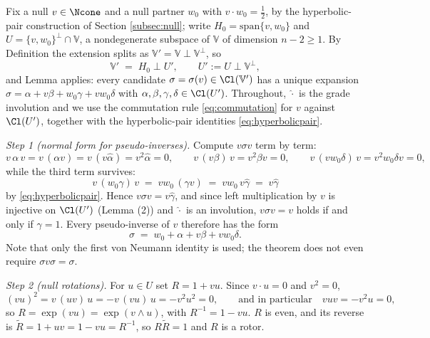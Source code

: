 Fix a null $v \in \Ncone$ and a null partner $w_0$ with $v \cdot w_0 = \tfrac12$, by the hyperbolic-pair construction of Section \ref{subsec:null}; write $H_0 = \mathrm{span}\{v, w_0\}$ and $U = \{v, w_0\}^{\perp} \cap \mathbb{V}$, a nondegenerate subspace of $\mathbb{V}$ of dimension $n - 2 \geq 1$. By Definition  the extension splits as $\mathbb{V}' = \mathbb{V} \perp \mathbb{V}^{\perp}$, so
\[
\mathbb{V}' \;=\; H_0 \perp U', \qquad U' \mathrel{:=} U \perp \mathbb{V}^{\perp},
\]
and Lemma  applies: every candidate $\sigma = \sigma(v) \in \Cl(\mathbb{V}')$ has a unique expansion $\sigma = \alpha + v\beta + w_0\gamma + v w_0 \delta$ with $\alpha, \beta, \gamma, \delta \in \Cl(U')$. Throughout, $\hat{\cdot}$ is the grade involution and we use the commutation rule \eqref{eq:commutation} for $v$ against $\Cl(U')$, together with the hyperbolic-pair identities \eqref{eq:hyperbolicpair}.

\emph{Step 1 (normal form for pseudo-inverses).} Compute $v\sigma v$ term by term:
\[
v\,\alpha\, v = v\, (\alpha v) = v\,(v \hat{\alpha}) = v^2 \hat\alpha = 0, \qquad
v\,(v\beta)\,v = v^2 \beta v = 0, \qquad
v\,(v w_0 \delta)\,v = v^2 w_0 \delta v = 0,
\]
while the third term survives:
\[
v\,(w_0 \gamma)\,v \;=\; v w_0\,(\gamma v) \;=\; v w_0\, v \hat{\gamma} \;=\; v \hat{\gamma}
\]
by \eqref{eq:hyperbolicpair}. Hence $v \sigma v = v \hat{\gamma}$, and since left multiplication by $v$ is injective on $\Cl(U')$ (Lemma (2)) and $\hat{\cdot}$ is an involution, $v \sigma v = v$ holds if and only if $\gamma = 1$. Every pseudo-inverse of $v$ therefore has the form
\[
\sigma \;=\; w_0 + \alpha + v\beta + v w_0 \delta .
\]
Note that only the first von Neumann identity is used; the theorem does not even require $\sigma v \sigma = \sigma$.

\emph{Step 2 (null rotations).} For $u \in U$ set $R = 1 + vu$. Since $v \cdot u = 0$ and $v^2 = 0$,
\[
(vu)^2 = v\,(uv)\,u = -v\,(vu)\,u = -v^2 u^2 = 0, \qquad \text{and in particular} \quad vuv = -v^2u = 0,
\]
so $R = \exp(vu) = \exp(v \wedge u)$, with $R^{-1} = 1 - vu$. $R$ is even, and its reverse is $\widetilde{R} = 1 + uv = 1 - vu = R^{-1}$, so $R \widetilde{R} = 1$ and $R$ is a rotor.

